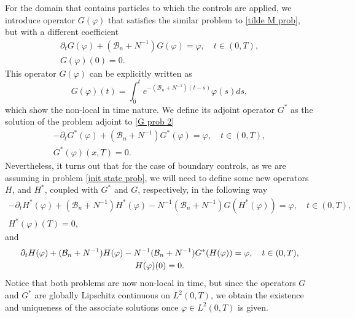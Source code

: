 \documentclass[10pt,a4paper]{amsart}
\numberwithin{equation}{section}
\begin{document}
For the domain that contains particles to which the controls are applied, we
introduce operator $G(\varphi )$ that satisfies the similar problem to 
\eqref{tilde M prob}, but with a different coefficient
\begin{equation}
\begin{gathered}
\partial _{t}G(\varphi )+(\mathcal{B}_n+N^{-1})G(\varphi )=\varphi , \quad
t\in (0,T), \\
G(\varphi )(0)=0.
\end{gathered}  \label{G prob 2}
\end{equation}
This operator $G(\varphi )$ can be explicitly written as
\[
G(\varphi )(t)=\int _0^{t}e^{-(\mathcal{B}_n+N^{-1})(t-s)}\varphi
(s)ds,
\]
which show the non-local in time nature. We define its adjoint operator
$G^{\ast }$ as the solution of the problem adjoint to \eqref{G prob 2}
\begin{equation}
\begin{gathered}
-\partial _{t}G^{\ast }(\varphi )+(\mathcal{B}_n+N^{-1})G^{\ast }(\varphi
)=\varphi , \quad t\in (0,T), \\
G^{\ast }(\varphi )(x,T)=0.
\end{gathered} \label{adj G prob 2}
\end{equation}
Nevertheless, it turns out that for the case of boundary controls, as we are
assuming in problem \eqref{init state prob}, we will need to define some new
operators $H$, and $H^{\ast }$, coupled with $G^{\ast }$ and $G$,
respectively, in the following way
\begin{equation}
\begin{gathered}
-\partial _{t}H^{\ast }(\varphi )+(\mathcal{B}_n+N^{-1})H^{\ast }(\varphi
)-N^{-1}(\mathcal{B}_n+N^{-1})G(H^{\ast }(\varphi ))=\varphi , \quad t\in
(0,T), \\
H^{\ast }(\varphi )(T)=0,
\end{gathered}  \label{adj H prob 2}
\end{equation}
and
\begin{equation}
\begin{gathered}
\partial _{t}H(\varphi )+(\mathcal{B}_n+N^{-1})H(\varphi )-N^{-1}(\mathcal{%
B}_n+N^{-1})G^{\ast }(H(\varphi ))=\varphi , \quad t\in (0,T), \\
H(\varphi )(0)=0.
\end{gathered}  \label{H prob 2}
\end{equation}
Notice that both problems are now non-local in time, but since the operators
$G$ and $G^{\ast }$ are globally Lipschitz continuous on $L^2(0,T)$,
we obtain the existence and uniqueness of the associate solutions once
$\varphi \in L^2(0,T)$ is given.
\end{document}
